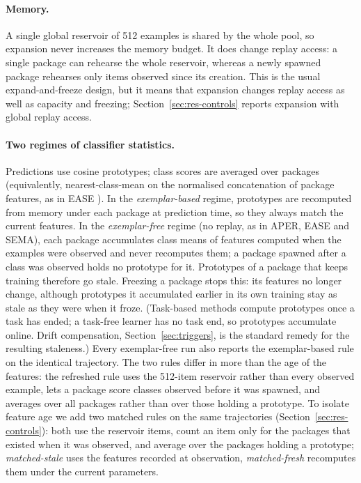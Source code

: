 \documentclass[10pt]{article}
\begin{document}
\paragraph{Memory.} A single global reservoir \citep{vitter1985reservoir} of 512 examples is shared by the whole pool, so expansion never increases the memory budget. It does change replay access: a single package can rehearse the whole reservoir, whereas a newly spawned package rehearses only items observed since its creation. This is the usual expand-and-freeze design, but it means that expansion changes replay access as well as capacity and freezing; Section~\ref{sec:res-controls} reports expansion with global replay access.

\paragraph{Two regimes of classifier statistics.} Predictions use cosine prototypes; class scores are averaged over packages (equivalently, nearest-class-mean on the normalised concatenation of package features, as in EASE \citep{zhou2024ease}). In the \emph{exemplar-based} regime, prototypes are recomputed from memory under each package at prediction time, so they always match the current features. In the \emph{exemplar-free} regime (no replay, as in APER, EASE and SEMA), each package accumulates class means of features computed when the examples were observed and never recomputes them; a package spawned after a class was observed holds no prototype for it. Prototypes of a package that keeps training therefore go stale. Freezing a package stops this: its features no longer change, although prototypes it accumulated earlier in its own training stay as stale as they were when it froze. (Task-based methods compute prototypes once a task has ended; a task-free learner has no task end, so prototypes accumulate online. Drift compensation, Section~\ref{sec:triggers}, is the standard remedy for the resulting staleness.) Every exemplar-free run also reports the exemplar-based rule on the identical trajectory. The two rules differ in more than the age of the features: the refreshed rule uses the 512-item reservoir rather than every observed example, lets a package score classes observed before it was spawned, and averages over all packages rather than over those holding a prototype. To isolate feature age we add two matched rules on the same trajectories (Section~\ref{sec:res-controls}): both use the reservoir items, count an item only for the packages that existed when it was observed, and average over the packages holding a prototype; \emph{matched-stale} uses the features recorded at observation, \emph{matched-fresh} recomputes them under the current parameters.
\end{document}
